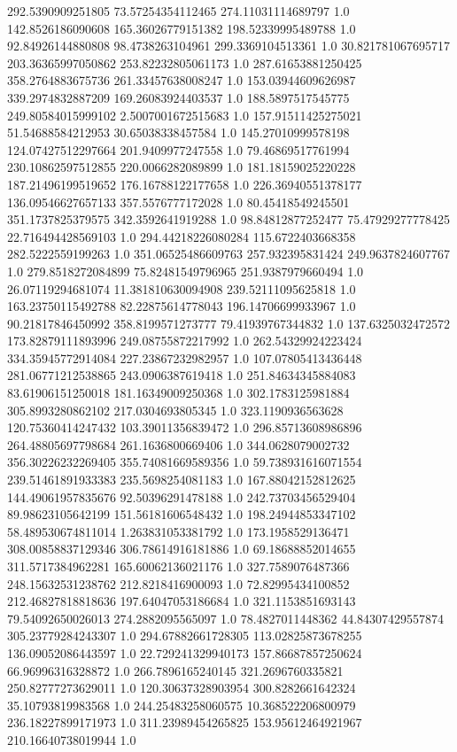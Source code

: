 292.5390909251805	73.57254354112465	274.11031114689797	1.0
142.8526186090608	165.36026779151382	198.52339995489788	1.0
92.84926144880808	98.4738263104961	299.3369104513361	1.0
30.821781067695717	203.36365997050862	253.82232805061173	1.0
287.61653881250425	358.2764883675736	261.33457638008247	1.0
153.03944609626987	339.2974832887209	169.26083924403537	1.0
188.5897517545775	249.80584015999102	2.5007001672515683	1.0
157.91511425275021	51.54688584212953	30.65038338457584	1.0
145.27010999578198	124.07427512297664	201.9409977247558	1.0
79.46869517761994	230.10862597512855	220.0066282089899	1.0
181.18159025220228	187.21496199519652	176.16788122177658	1.0
226.36940551378177	136.09546627657133	357.5576777172028	1.0
80.45418549245501	351.1737825379575	342.3592641919288	1.0
98.84812877252477	75.47929277778425	22.716494428569103	1.0
294.44218226080284	115.6722403668358	282.5222559199263	1.0
351.06525486609763	257.932395831424	249.9637824607767	1.0
279.8518272084899	75.82481549796965	251.9387979660494	1.0
26.07119294681074	11.381810630094908	239.52111095625818	1.0
163.23750115492788	82.22875614778043	196.14706699933967	1.0
90.21817846450992	358.8199571273777	79.41939767344832	1.0
137.6325032472572	173.82879111893996	249.08755872217992	1.0
262.54329924223424	334.35945772914084	227.23867232982957	1.0
107.07805413436448	281.06771212538865	243.0906387619418	1.0
251.84634345884083	83.61906151250018	181.16349009250368	1.0
302.1783125981884	305.8993280862102	217.0304693805345	1.0
323.1190936563628	120.75360414247432	103.39011356839472	1.0
296.85713608986896	264.48805697798684	261.1636800669406	1.0
344.0628079002732	356.30226232269405	355.74081669589356	1.0
59.738931616071554	239.51461891933383	235.5698254081183	1.0
167.88042152812625	144.49061957835676	92.50396291478188	1.0
242.73703456529404	89.98623105642199	151.56181606548432	1.0
198.24944853347102	58.489530674811014	1.263831053381792	1.0
173.1958529136471	308.00858837129346	306.78614916181886	1.0
69.18688852014655	311.5717384962281	165.60062136021176	1.0
327.7589076487366	248.15632531238762	212.8218416900093	1.0
72.82995434100852	212.46827818818636	197.64047053186684	1.0
321.1153851693143	79.54092650026013	274.2882095565097	1.0
78.4827011448362	44.84307429557874	305.23779284243307	1.0
294.67882661728305	113.02825873678255	136.09052086443597	1.0
22.729241329940173	157.86687857250624	66.96996316328872	1.0
266.7896165240145	321.2696760335821	250.82777273629011	1.0
120.30637328903954	300.8282661642324	35.10793819983568	1.0
244.25483258060575	10.368522206800979	236.18227899171973	1.0
311.23989454265825	153.95612464921967	210.16640738019944	1.0
